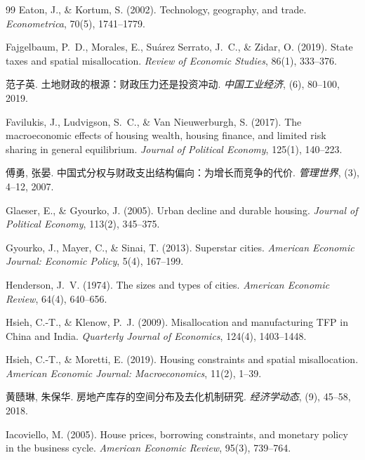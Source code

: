 \documentclass[UTF8,a4paper,12pt]{ctexart}
\theoremstyle{plain}
\theoremstyle{definition}
\theoremstyle{remark}
\begin{document}
\begin{thebibliography}{99}
Eaton, J., \& Kortum, S. (2002).
Technology, geography, and trade.
\textit{Econometrica}, 70(5), 1741--1779.

Fajgelbaum, P.~D., Morales, E., Su\'{a}rez Serrato, J.~C., \& Zidar, O. (2019).
State taxes and spatial misallocation.
\textit{Review of Economic Studies}, 86(1), 333--376.

范子英.
土地财政的根源：财政压力还是投资冲动.
\textit{中国工业经济}, (6), 80--100, 2019.

Favilukis, J., Ludvigson, S.~C., \& Van Nieuwerburgh, S. (2017).
The macroeconomic effects of housing wealth, housing finance,
and limited risk sharing in general equilibrium.
\textit{Journal of Political Economy}, 125(1), 140--223.

傅勇, 张晏.
中国式分权与财政支出结构偏向：为增长而竞争的代价.
\textit{管理世界}, (3), 4--12, 2007.

Glaeser, E., \& Gyourko, J. (2005).
Urban decline and durable housing.
\textit{Journal of Political Economy}, 113(2), 345--375.

Gyourko, J., Mayer, C., \& Sinai, T. (2013).
Superstar cities.
\textit{American Economic Journal: Economic Policy}, 5(4), 167--199.

Henderson, J.~V. (1974).
The sizes and types of cities.
\textit{American Economic Review}, 64(4), 640--656.

Hsieh, C.-T., \& Klenow, P.~J. (2009).
Misallocation and manufacturing TFP in China and India.
\textit{Quarterly Journal of Economics}, 124(4), 1403--1448.

Hsieh, C.-T., \& Moretti, E. (2019).
Housing constraints and spatial misallocation.
\textit{American Economic Journal: Macroeconomics}, 11(2), 1--39.

黄赜琳, 朱保华.
房地产库存的空间分布及去化机制研究.
\textit{经济学动态}, (9), 45--58, 2018.

Iacoviello, M. (2005).
House prices, borrowing constraints, and monetary policy in the business cycle.
\textit{American Economic Review}, 95(3), 739--764.


\end{thebibliography}
\end{document}
